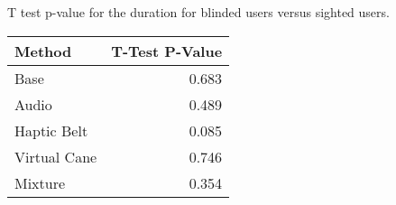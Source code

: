 
\centering
\caption{T test p-value for the duration for blinded users versus sighted users.}
\label{tab:ttest_duration}
\begin{tabular}{lr}
\toprule
      Method &  T-Test P-Value \\
\midrule
        Base &           0.683 \\
       Audio &           0.489 \\
 Haptic Belt &           0.085 \\
Virtual Cane &           0.746 \\
     Mixture &           0.354 \\
\bottomrule
\end{tabular}
